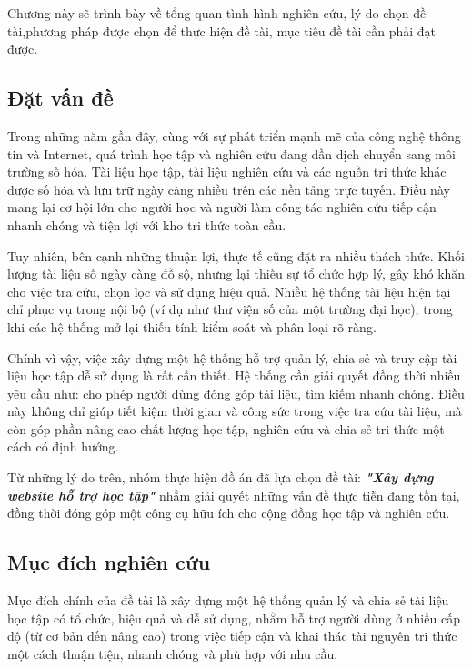 \documentclass{article}
\begin{document}
	Chương này sẽ trình bày về tổng quan tình hình nghiên cứu, lý do chọn đề tài,phương pháp được chọn để thực hiện đề tài, mục tiêu đề tài cần phải đạt được.
	
	\subsection{Đặt vấn đề}
	
	Trong những năm gần đây, cùng với sự phát triển mạnh mẽ của công nghệ thông tin và Internet, quá trình học tập và nghiên cứu đang dần dịch chuyển sang môi trường số hóa. Tài liệu học tập, tài liệu nghiên cứu và các nguồn tri thức khác được số hóa và lưu trữ ngày càng nhiều trên các nền tảng trực tuyến. Điều này mang lại cơ hội lớn cho người học và người làm công tác nghiên cứu tiếp cận nhanh chóng và tiện lợi với kho tri thức toàn cầu.
	
	Tuy nhiên, bên cạnh những thuận lợi, thực tế cũng đặt ra nhiều thách thức. Khối lượng tài liệu số ngày càng đồ sộ, nhưng lại thiếu sự tổ chức hợp lý, gây khó khăn cho việc tra cứu, chọn lọc và sử dụng hiệu quả. Nhiều hệ thống tài liệu hiện tại chỉ phục vụ trong nội bộ (ví dụ như thư viện số của một trường đại học), trong khi các hệ thống mở lại thiếu tính kiểm soát và phân loại rõ ràng. 
	
	Chính vì vậy, việc xây dựng một hệ thống hỗ trợ quản lý, chia sẻ và truy cập tài liệu học tập dễ sử dụng là rất cần thiết. Hệ thống cần giải quyết đồng thời nhiều yêu cầu như: cho phép người dùng đóng góp tài liệu, tìm kiếm nhanh chóng. Điều này không chỉ giúp tiết kiệm thời gian và công sức trong việc tra cứu tài liệu, mà còn góp phần nâng cao chất lượng học tập, nghiên cứu và chia sẻ tri thức một cách có định hướng.
	
	Từ những lý do trên, nhóm thực hiện đồ án đã lựa chọn đề tài: \textbf{\textit{"Xây dựng website hỗ trợ học tập"}} nhằm giải quyết những vấn đề thực tiễn đang tồn tại, đồng thời đóng góp một công cụ hữu ích cho cộng đồng học tập và nghiên cứu.
	
	\subsection{Mục đích nghiên cứu}
	
	Mục đích chính của đề tài là xây dựng một hệ thống quản lý và chia sẻ tài liệu học tập có tổ chức, hiệu quả và dễ sử dụng, nhằm hỗ trợ người dùng ở nhiều cấp độ (từ cơ bản đến nâng cao) trong việc tiếp cận và khai thác tài nguyên tri thức một cách thuận tiện, nhanh chóng và phù hợp với nhu cầu.
	
\end{document}
